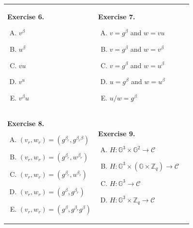 \documentclass[../lecture-notes.tex]{subfiles}
\begin{document}
\begin{tcolorbox}[colback=gray!10!white,fonttitle=\bfseries,colframe=purple!80!black,title=Exercises 6-10. Non-Interactive Chaum-Pedersen Protocol.]
    \begin{center}
        \begin{tabular}{p{5cm}p{5.15cm}p{6cm}}
            \textbf{Exercise 6.}
            \begin{enumerate}[A)]
                \item $v^{\beta}$
                \item $u^{\beta}$
                \item $vu$
                \item $v^u$
                \item $v^{\beta}u$
            \end{enumerate} &   
            \textbf{Exercise 7.}
            \begin{enumerate}[A)]
                \item $v = g^{\beta}$ and $w = vu$
                \item $v = g^{\beta}$ and $w = v^{\beta}$
                \item $v = g^{\beta}$ and $w = u^{\beta}$
                \item $u = g^{\beta}$ and $w = u^{\beta}$
                \item $u/w = g^{\beta}$
            \end{enumerate} & \\
            \textbf{Exercise 8.}
            \begin{enumerate}[A)]
                \item $(v_r,w_r) = (g^{\beta_r},g^{\beta_r\beta})$
                \item $(v_r,w_r) = (g^{\beta_r},w^{\beta_r})$
                \item $(v_r,w_r) = (g^{\beta_r},u^{\beta_r})$
                \item $(v_r,w_r) = (g^{\beta},g^{\beta_r})$
                \item $(v_r,w_r) = (g^{\beta},g^{\beta_r}g^{\beta})$
            \end{enumerate}
            &
            \textbf{Exercise 9.}
            \begin{enumerate}[A)]
                \item $H: \mathbb{G}^3 \times \mathbb{G}^2 \to \mathcal{C}$
                \item $H: \mathbb{G}^3 \times (\mathbb{G} \times \mathbb{Z}_q) \to \mathcal{C}$
                \item $H: \mathbb{G}^3 \to \mathcal{C}$
                \item $H: \mathbb{G}^3 \times \mathbb{Z}_q \to \mathcal{C}$

\end{enumerate}
\end{tabular}
\end{center}
\end{tcolorbox}
\end{document}
